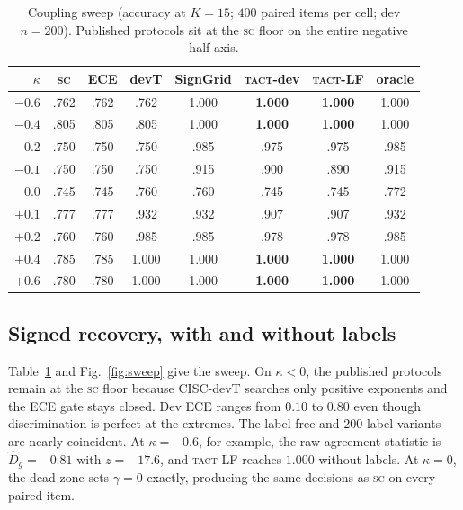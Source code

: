 \documentclass{article}
\newcommand{\Dhat}{\widehat{D}}
\newcommand{\SC}{\textsc{sc}}
\newcommand{\TACT}{\textsc{tact}}
\begin{document}
\begin{table}[t]
\centering
\caption{Coupling sweep (accuracy at $K{=}15$; $400$ paired items per cell; dev $n{=}200$). Published protocols sit at the \SC{} floor on the entire negative half-axis.}
\label{tab:sweep}
\setlength{\tabcolsep}{3.4pt}
\begin{tabular}{r cc cc cc c}
\toprule
$\kappa$ & \SC & ECE & devT & SignGrid & \textbf{\TACT-dev} & \textbf{\TACT-LF} & oracle\\
\midrule
$-0.6$ & .762 & .762 & .762 & 1.000 & \textbf{1.000} & \textbf{1.000} & 1.000\\
$-0.4$ & .805 & .805 & .805 & 1.000 & \textbf{1.000} & \textbf{1.000} & 1.000\\
$-0.2$ & .750 & .750 & .750 & .985 & .975 & .975 & .985\\
$-0.1$ & .750 & .750 & .750 & .915 & .900 & .890 & .915\\
$0.0$  & .745 & .745 & .760 & .760 & .745 & .745 & .772\\
$+0.1$ & .777 & .777 & .932 & .932 & .907 & .907 & .932\\
$+0.2$ & .760 & .760 & .985 & .985 & .978 & .978 & .985\\
$+0.4$ & .785 & .785 & 1.000 & 1.000 & \textbf{1.000} & \textbf{1.000} & 1.000\\
$+0.6$ & .780 & .780 & 1.000 & 1.000 & \textbf{1.000} & \textbf{1.000} & 1.000\\
\bottomrule
\end{tabular}
\end{table}
\subsection{Signed recovery, with and without labels}
Table~\ref{tab:sweep} and Fig.~\ref{fig:sweep} give the sweep. On $\kappa<0$,
the published protocols remain at the \SC{} floor because CISC-devT searches
only positive exponents and the ECE gate stays closed. Dev ECE ranges from
$0.10$ to $0.80$ even though discrimination is perfect at the extremes. The
label-free and $200$-label variants are nearly coincident. At
$\kappa=-0.6$, for example, the raw agreement statistic is
$\Dhat_g=-0.81$ with $z=-17.6$, and \TACT-LF reaches $1.000$ without labels.
At $\kappa=0$, the dead zone sets $\gamma=0$ exactly, producing the same
decisions as \SC{} on every paired item.
\end{document}
